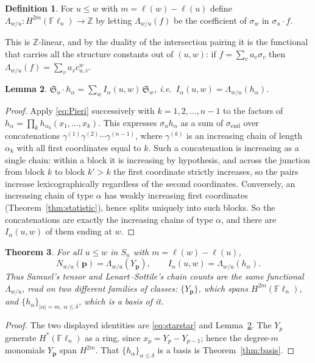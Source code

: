 \documentclass[11pt]{article}
\theoremstyle{plain}
\newtheorem{theorem}{Theorem}[section]
\newtheorem{lemma}[theorem]{Lemma}
\theoremstyle{definition}
\newtheorem{definition}[theorem]{Definition}
\DeclareMathOperator{\len}{\ell}
\newcommand{\Sch}{\mathfrak{S}}
\newcommand{\Fl}{\mathbb{F}\ell}
\newcommand{\pv}{\mathbf{p}}
\begin{document}
\begin{definition}
For $u\le w$ with $m=\len(w)-\len(u)$ define
$\Lambda_{w/u}\colon H^{2m}(\Fl_n)\to\mathbb{Z}$ by letting $\Lambda_{w/u}(f)$ be
the coefficient of $\sigma_w$ in $\sigma_u\cdot f$.
\end{definition}

This is $\mathbb{Z}$-linear, and by the duality of the intersection pairing it
is the functional that carries all the structure constants out of $(u,w)$: if
$f=\sum_v a_v\sigma_v$ then $\Lambda_{w/u}(f)=\sum_v a_v c^w_{u,v}$.

\begin{lemma}\label{lem:LS-expansion}
$\displaystyle \Sch_u\cdot h_\alpha=\sum_w I_\alpha(u,w)\,\Sch_w$, i.e.\
$I_\alpha(u,w)=\Lambda_{w/u}(h_\alpha)$.
\end{lemma}

\begin{proof}
Apply \eqref{eq:Pieri} successively with $k=1,2,\dots,n-1$ to the factors of
$h_\alpha=\prod_k h_{\alpha_k}(x_1,\dots,x_k)$. This expresses
$\sigma_u h_\alpha$ as a sum of $\sigma_{\mathrm{end}}$ over concatenations
$\gamma^{(1)}\gamma^{(2)}\cdots\gamma^{(n-1)}$, where $\gamma^{(k)}$ is an
increasing chain of length $\alpha_k$ with all first coordinates equal to $k$.
Such a concatenation is increasing as a single chain: within a block it is
increasing by hypothesis, and across the junction from block $k$ to block $k'>k$
the first coordinate strictly increases, so the pairs increase lexicographically
regardless of the second coordinates. Conversely, an increasing chain of type
$\alpha$ has weakly increasing first coordinates
(Theorem~\ref{thm:statistic}), hence splits uniquely into such blocks. So the
concatenations are exactly the increasing chains of type $\alpha$, and there are
$I_\alpha(u,w)$ of them ending at $w$.
\end{proof}

\begin{theorem}\label{thm:one-functional}
For all $u\le w$ in $S_n$ with $m=\len(w)-\len(u)$,
\[
  N_{w/u}(\pv)=\Lambda_{w/u}(Y_\pv),
  \qquad
  I_\alpha(u,w)=\Lambda_{w/u}(h_\alpha).
\]
Thus Samuel's tensor and Lenart--Sottile's chain counts are the \emph{same}
functional $\Lambda_{w/u}$, read on two different families of classes:
$\{Y_\pv\}$, which spans $H^{2m}(\Fl_n)$, and $\{h_\alpha\}_{|\alpha|=m,\
\alpha\le\delta}$, which is a basis of it.
\end{theorem}

\begin{proof}
The two displayed identities are \eqref{eq:starstar} and
Lemma~\ref{lem:LS-expansion}. The $Y_p$ generate $H^*(\Fl_n)$ as a ring, since
$x_p=Y_p-Y_{p-1}$; hence the degree-$m$ monomials $Y_\pv$ span $H^{2m}$. That
$\{h_\alpha\}_{\alpha\le\delta}$ is a basis is Theorem~\ref{thm:basis}.
\end{proof}
\end{document}
